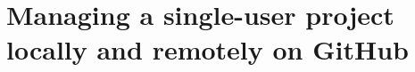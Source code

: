 \documentclass[10pt,svgnames]{beamer}
\begin{document}






\section{Managing a single-user project locally and remotely on GitHub}
\end{document}
